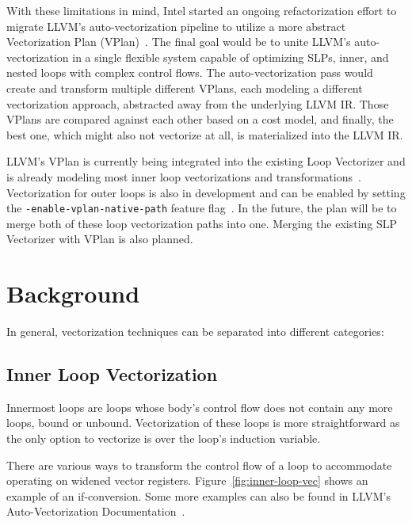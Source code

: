 \documentclass[sigplan,11pt,nonacm]{acmart}
\begin{document}
With these limitations in mind, Intel started an ongoing refactorization effort to migrate LLVM's
auto-vectorization pipeline to utilize a more abstract Vectorization Plan 
(VPlan)~\cite{llvmextloopvec,llvmvplan}. The final goal would be to unite LLVM's auto-vectorization
in a single flexible system capable of optimizing SLPs, inner, and nested loops with complex 
control flows. The auto-vectorization pass would create and transform multiple different 
VPlans, each modeling a different vectorization approach, abstracted away from the underlying LLVM IR.
Those VPlans are compared against each other based on a cost model, and finally, the best one, which
might also not vectorize at all, is materialized into the LLVM IR.

LLVM's VPlan is currently being integrated into the existing Loop Vectorizer and is
already modeling most inner loop vectorizations and transformations~\cite{llvmvplanupdate}. 
Vectorization for outer loops is also in development and can be enabled by setting 
the \texttt{-enable-\allowbreak vplan-\allowbreak native-\allowbreak path} feature 
flag~\cite{llvmouterloop,llvmouterloopstatus}. 
In the future, the plan will be to merge both of these loop vectorization paths into one. 
Merging the existing SLP Vectorizer with VPlan is also planned.




\section{Background}
\label{sec:background}
In general, vectorization techniques can be separated into different categories:

\subsection{Inner Loop Vectorization}
Innermost loops are loops whose body's control flow does not contain any more loops, bound or unbound.
Vectorization of these loops is more straightforward as the only option to vectorize is over 
the loop's induction variable.

There are various ways to transform the control flow of a loop to accommodate operating on widened
vector registers. Figure~\ref{fig:inner-loop-vec} shows an example of an if-conversion. Some more
examples can also be found in LLVM's Auto-Vectorization Documentation~\cite{llvmvec}.
\end{document}
